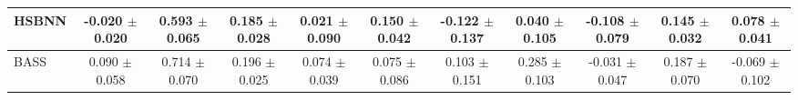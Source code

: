 \begin{table}[t]
{\begin{tabular}{lcccccccccc}
\midrule
\shortstack[l]{HSBNN \\ {}} & \shortstack{-0.020 \\ $\pm$ 0.020} & \shortstack{0.593 \\ $\pm$ 0.065} & \shortstack{0.185 \\ $\pm$ 0.028} & \shortstack{0.021 \\ $\pm$ 0.090} & \shortstack{0.150 \\ $\pm$ 0.042} & \shortstack{-0.122 \\ $\pm$ 0.137} & \shortstack{0.040 \\ $\pm$ 0.105} & \shortstack{-0.108 \\ $\pm$ 0.079} & \shortstack{0.145 \\ $\pm$ 0.032} & \shortstack{0.078 \\ $\pm$ 0.041} \\
\midrule
\shortstack[l]{BASS \\ {}} & \shortstack{0.090 \\ $\pm$ 0.058} & \shortstack{0.714 \\ $\pm$ 0.070} & \shortstack{0.196 \\ $\pm$ 0.025} & \shortstack{0.074 \\ $\pm$ 0.039} & \shortstack{0.075 \\ $\pm$ 0.086} & \shortstack{0.103 \\ $\pm$ 0.151} & \shortstack{0.285 \\ $\pm$ 0.103} & \shortstack{-0.031 \\ $\pm$ 0.047} & \shortstack{0.187 \\ $\pm$ 0.070} & \shortstack{-0.069 \\ $\pm$ 0.102} \\
\bottomrule
\end{tabular}
}
\end{table}
